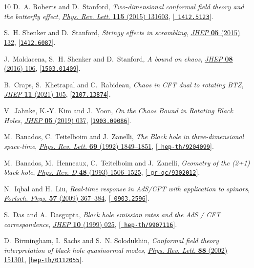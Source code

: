 \documentclass[11pt,a4paper]{article}
\begin{document}
\begin{thebibliography}{10}
D.~A. Roberts and D.~Stanford, \emph{{Two-dimensional conformal field theory
  and the butterfly effect}},
  \href{http://dx.doi.org/10.1103/PhysRevLett.115.131603}{\emph{Phys. Rev.
  Lett.} {\bf 115} (2015) 131603}, [\href{http://arxiv.org/abs/1412.5123}{{\tt
  1412.5123}}].

S.~H. Shenker and D.~Stanford, \emph{{Stringy effects in scrambling}},
  \href{http://dx.doi.org/10.1007/JHEP05(2015)132}{\emph{JHEP} {\bf 05} (2015)
  132}, [\href{http://arxiv.org/abs/1412.6087}{{\tt 1412.6087}}].

J.~Maldacena, S.~H. Shenker and D.~Stanford, \emph{{A bound on chaos}},
  \href{http://dx.doi.org/10.1007/JHEP08(2016)106}{\emph{JHEP} {\bf 08} (2016)
  106}, [\href{http://arxiv.org/abs/1503.01409}{{\tt 1503.01409}}].

B.~Craps, S.~Khetrapal and C.~Rabideau, \emph{{Chaos in CFT dual to rotating
  BTZ}}, \href{http://dx.doi.org/10.1007/JHEP11(2021)105}{\emph{JHEP} {\bf 11}
  (2021) 105}, [\href{http://arxiv.org/abs/2107.13874}{{\tt 2107.13874}}].

V.~Jahnke, K.-Y. Kim and J.~Yoon, \emph{{On the Chaos Bound in Rotating Black
  Holes}}, \href{http://dx.doi.org/10.1007/JHEP05(2019)037}{\emph{JHEP} {\bf
  05} (2019) 037}, [\href{http://arxiv.org/abs/1903.09086}{{\tt 1903.09086}}].

M.~Banados, C.~Teitelboim and J.~Zanelli, \emph{{The Black hole in
  three-dimensional space-time}},
  \href{http://dx.doi.org/10.1103/PhysRevLett.69.1849}{\emph{Phys. Rev. Lett.}
  {\bf 69} (1992) 1849--1851}, [\href{http://arxiv.org/abs/hep-th/9204099}{{\tt
  hep-th/9204099}}].

M.~Banados, M.~Henneaux, C.~Teitelboim and J.~Zanelli, \emph{{Geometry of the
  (2+1) black hole}},
  \href{http://dx.doi.org/10.1103/PhysRevD.48.1506}{\emph{Phys. Rev. D} {\bf
  48} (1993) 1506--1525}, [\href{http://arxiv.org/abs/gr-qc/9302012}{{\tt
  gr-qc/9302012}}].

N.~Iqbal and H.~Liu, \emph{{Real-time response in AdS/CFT with application to
  spinors}}, \href{http://dx.doi.org/10.1002/prop.200900057}{\emph{Fortsch.
  Phys.} {\bf 57} (2009) 367--384}, [\href{http://arxiv.org/abs/0903.2596}{{\tt
  0903.2596}}].

S.~Das and A.~Dasgupta, \emph{{Black hole emission rates and the AdS / CFT
  correspondence}},
  \href{http://dx.doi.org/10.1088/1126-6708/1999/10/025}{\emph{JHEP} {\bf 10}
  (1999) 025}, [\href{http://arxiv.org/abs/hep-th/9907116}{{\tt
  hep-th/9907116}}].

D.~Birmingham, I.~Sachs and S.~N. Solodukhin, \emph{{Conformal field theory
  interpretation of black hole quasinormal modes}},
  \href{http://dx.doi.org/10.1103/PhysRevLett.88.151301}{\emph{Phys. Rev.
  Lett.} {\bf 88} (2002) 151301},
  [\href{http://arxiv.org/abs/hep-th/0112055}{{\tt hep-th/0112055}}].

\end{thebibliography}\endgroup
\end{document}
